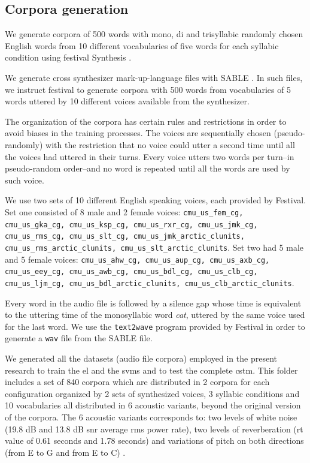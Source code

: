 {\subsection{Corpora generation}
\label{CorpGen}

We generate corpora of 500 words with mono, di and trisyllabic randomly chosen English words from 10 different vocabularies of five words
for each syllabic condition using \gls{festival} Synthesis \cite{festival2014}.

We generate cross synthesizer mark-up-language files with SABLE \cite{sable}.
In such files, we instruct \gls{festival} to generate corpora with 500 words from vocabularies of
5 words uttered by 10 different voices available from the synthesizer.

The organization of the corpora has certain rules and restrictions in order to avoid biases in the training processes.
The voices are sequentially chosen (pseudo-randomly) with the restriction that no voice could utter a second time until all the voices had uttered in their turns. Every voice utters two words per turn--in pseudo-random order--and no word is repeated until all the words are used by such voice. 

We use two sets of 10 different English speaking voices, each provided by Festival. Set one consisted of 8 male and 2 female voices: \texttt{cmu\_us\_fem\_cg, cmu\_us\_gka\_cg, cmu\_us\_ksp\_cg, cmu\_us\_rxr\_cg, cmu\_us\_jmk\_cg, cmu\_us\_rms\_cg, cmu\_us\_slt\_cg, cmu\_us\_jmk\_arctic\_clunits, cmu\_us\_rms\_arctic\_clunits, cmu\_us\_slt\_arctic\_clunits}. Set two had 5 male and 5 female voices: \texttt{cmu\_us\_ahw\_cg, cmu\_us\_aup\_cg, cmu\_us\_axb\_cg, cmu\_us\_eey\_cg, cmu\_us\_awb\_cg, cmu\_us\_bdl\_cg, cmu\_us\_clb\_cg, cmu\_us\_ljm\_cg, cmu\_us\_bdl\_arctic\_clunits, cmu\_us\_clb\_arctic\_clunits}.

Every word in the audio file is followed by a silence gap whose time is equivalent to the uttering time of the monosyllabic word \textit{cat}, uttered by the same voice used for the last word. We use the \texttt{text2wave} program provided by Festival in order to generate a \texttt{wav} file from the SABLE file.

We generated all the datasets (audio file corpora) employed in the present research to train the \gls{el} and the \glspl{svm} and to test the complete \gls{cstm}. This folder includes a set of 840 corpora which are distributed in 2 corpora for each configuration organized by 2 sets of synthesized voices, 3 syllabic conditions and 10 vocabularies all distributed in 6 acoustic variants, beyond the original version of the corpora. The 6 acoustic variants corresponds to: two levels of white noise (19.8 dB and 13.8 dB \gls{snr} average \gls{rms} power rate), two levels of reverberation (\gls{rt} value of 0.61 seconds and 1.78 seconds) and variations of pitch on both directions (from E to G and from E to C) \cite{dematties_dario_2019_2576130}.
}
